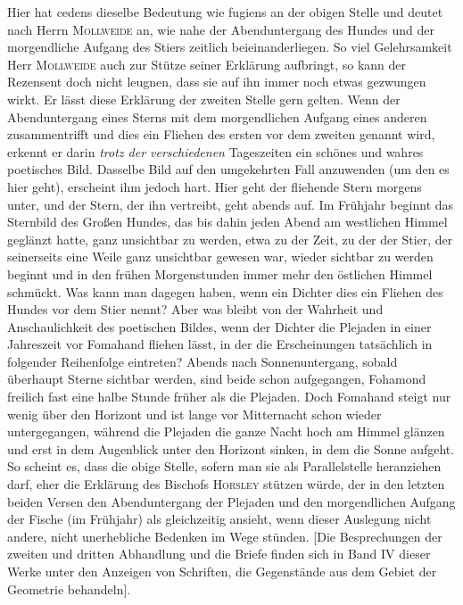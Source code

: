 \noindent Hier hat cedens dieselbe Bedeutung wie fugiens an der obigen Stelle und deutet nach Herrn \textsc{Mollweide} an, wie nahe der Abenduntergang des Hundes und der morgendliche Aufgang des Stiers zeitlich beieinanderliegen. So viel Gelehrsamkeit Herr \textsc{Mollweide} auch zur Stütze seiner Erklärung aufbringt, so kann der Rezensent doch nicht leugnen, dass sie auf ihn immer noch etwas gezwungen wirkt. Er lässt diese Erklärung der zweiten Stelle gern gelten. Wenn der Abenduntergang eines Sterns mit dem morgendlichen Aufgang eines anderen zusammentrifft und dies ein Fliehen des ersten vor dem zweiten genannt wird, erkennt er darin \emph{trotz der verschiedenen} Tageszeiten ein schönes und wahres poetisches Bild. Dasselbe Bild auf den umgekehrten Fall anzuwenden (um den es hier geht), erscheint ihm jedoch hart. Hier geht der fliehende Stern morgens unter, und der Stern, der ihn vertreibt, geht abends auf. Im Frühjahr beginnt das Sternbild des Großen Hundes, das bis dahin jeden Abend am westlichen Himmel geglänzt hatte, ganz unsichtbar zu werden, etwa zu der Zeit, zu der der Stier, der seinerseits eine Weile ganz unsichtbar gewesen war, wieder sichtbar zu werden beginnt und in den frühen Morgenstunden immer mehr den östlichen Himmel schmückt. Was kann man dagegen haben, wenn ein Dichter dies ein Fliehen des Hundes vor dem Stier nennt? Aber was bleibt von der Wahrheit und Anschaulichkeit des poetischen Bildes, wenn der Dichter die Plejaden in einer Jahreszeit vor Fomahand fliehen lässt, in der die Erscheinungen tatsächlich in folgender Reihenfolge eintreten? Abends nach Sonnenuntergang, sobald überhaupt Sterne sichtbar werden, sind beide schon aufgegangen, Fohamond freilich fast eine halbe Stunde früher als die Plejaden. Doch Fomahand steigt nur wenig über den Horizont und ist lange vor Mitternacht schon wieder untergegangen, während die Plejaden die ganze Nacht hoch am Himmel glänzen und erst in dem Augenblick unter den Horizont sinken, in dem die Sonne aufgeht. So scheint es, dass die obige Stelle, sofern man sie als Parallelstelle heranziehen darf, eher die Erklärung des Bischofs \textsc{Horsley} stützen würde, der in den letzten beiden Versen den Abenduntergang der Plejaden und den morgendlichen Aufgang der Fische (im Frühjahr) als gleichzeitig ansieht, wenn dieser Auslegung nicht andere, nicht unerhebliche Bedenken im Wege stünden. [Die Besprechungen der zweiten und dritten Abhandlung und die Briefe finden sich in Band IV dieser Werke unter den Anzeigen von Schriften, die Gegenstände aus dem Gebiet der Geometrie behandeln].

